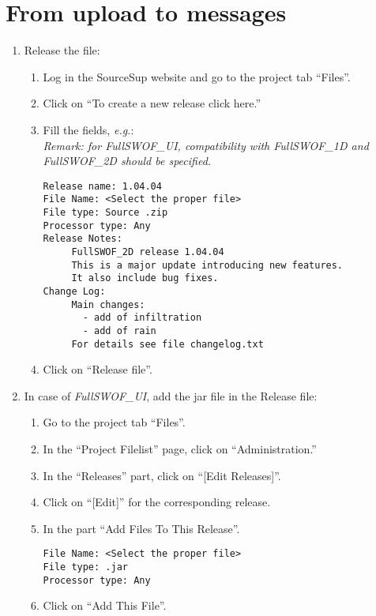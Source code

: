\documentclass[a4paper, 11pt]{article}
\newcommand{\FullSWOFoneD}{\emph{FullSWOF\_1D}}
\newcommand{\FullSWOFtwoD}{\emph{FullSWOF\_2D}}
\newcommand{\FullSWOFUI}{\emph{FullSWOF\_UI}}
\begin{document}
\section{From upload to messages}
\begin{enumerate}
\item Release the file:
\begin{enumerate}
\item Log in the SourceSup website and go to the project tab ``Files''.
\item Click on ``To create a new release click here.''
\item Fill the fields, \emph{e.g.}:\\
\emph{Remark: for \FullSWOFUI, compatibility with \FullSWOFoneD{} and \FullSWOFtwoD{} should be specified.}
\begin{verbatim}
Release name: 1.04.04
File Name: <Select the proper file>
File type: Source .zip
Processor type: Any
Release Notes:
     FullSWOF_2D release 1.04.04
     This is a major update introducing new features.
     It also include bug fixes.
Change Log:
     Main changes:
       - add of infiltration
       - add of rain
     For details see file changelog.txt
\end{verbatim}
\item Click on ``Release file''.
\end{enumerate}

\color[gray]{0.4}
\item In case of \FullSWOFUI{}, add the jar file in the Release file:
\begin{enumerate}
\item Go to the project tab ``Files''.
\item In the ``Project Filelist'' page, click on ``Administration.''
\item In the ``Releases'' part, click on ``[Edit Releases]''.
\item Click on ``[Edit]'' for the corresponding release.
\item In the part ``Add Files To This Release''.
\begin{verbatim}
File Name: <Select the proper file>
File type: .jar
Processor type: Any
\end{verbatim}
\item Click on ``Add This File''.

\end{enumerate}

\color{black}


\end{enumerate}
\end{document}
